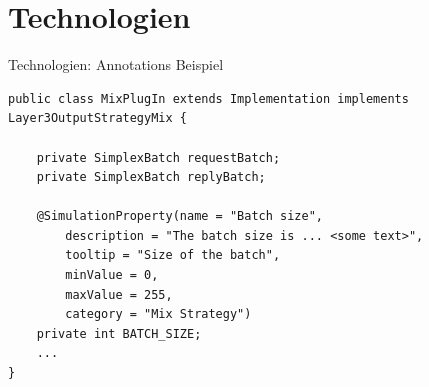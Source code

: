 \documentclass{beamer}
\begin{document}
\section{Technologien}

\begin{frame}[fragile]{Technologien: Annotations Beispiel}
\lstset{language=Java}
\begin{lstlisting}[caption={Beispiel zur Anwendung von Annotations}]
public class MixPlugIn extends Implementation implements Layer3OutputStrategyMix {

    private SimplexBatch requestBatch;
    private SimplexBatch replyBatch;
    
    @SimulationProperty(name = "Batch size", 
        description = "The batch size is ... <some text>", 
        tooltip = "Size of the batch",
        minValue = 0, 
        maxValue = 255, 
        category = "Mix Strategy")
    private int BATCH_SIZE;
    ...
}
\end{lstlisting}
\end{frame}
\end{document}
